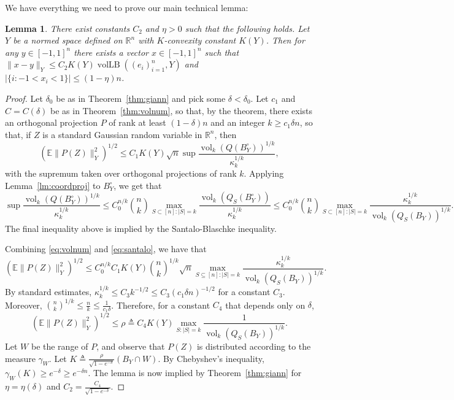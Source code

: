 \documentclass{article}
\newtheorem{lemma}{Lemma}
\newcommand{\R}{{\mathbb{R}}}
\newcommand{\E}{\mathbb{E}}
\newcommand{\eqdef}{\triangleq}
\DeclareMathOperator{\vollb}{volLB}
\DeclareMathOperator{\vol}{vol}
\begin{document}
We have everything we need to prove our main technical lemma:
\begin{lemma}\label{lm:partial}
  There exist constants $C_2$ and $\eta >0$ such that the following
  holds. Let $Y$ be a normed space defined on $\R^n$ with
  $K$-convexity constant $K(Y)$.  Then for any $y \in [-1, 1]^n$ there
  exists a vector $x \in [-1,1]^n$ such that $\|x-y\|_Y \le
  C_2K(Y)\vollb((e_i)_{i=1}^n, Y)$ and $|\{i: -1 < x_i < 1\}| \le
  (1-\eta)n$.
\end{lemma}
\begin{proof}
  Let $\delta_0$ be as in Theorem~\ref{thm:giann} and pick some
  $\delta < \delta_0$. Let $c_1$ and $C = C(\delta)$ be as in
  Theorem~\ref{thm:volnum}, so that, by the theorem, there exists an
  orthogonal projection $P$ of rank at least $(1-\delta)n$ and an
  integer $k \ge c_1 \delta n$, so that, if $Z$ is a standard Gaussian
  random variable in $\R^n$, then
  \begin{equation}\label{eq:volnum}
    \left(\E \|P(Z)\|_Y^2\right)^{1/2} \le
    C_1K(Y)\sqrt{n}
    \sup \frac{\vol_{k}(Q(B_Y^\circ))^{1/k}}{\kappa_k^{1/k}},
  \end{equation}
  with the supremum taken over orthogonal projections of rank
  $k$. Applying Lemma~\ref{lm:coordproj} to $B_Y^\circ$, we get that
  \begin{equation}\label{eq:santalo}
    \sup \frac{\vol_{k}(Q(B_Y^\circ))^{1/k}}{\kappa_k^{1/k}}
    \le 
    C_0^{n/k}{n \choose k}   \max_{S \subset [n]: |S|  = k} \frac{\vol_k(Q_S(B_Y^\circ))}{\kappa_k^{1/k}}
    \le 
    C_0^{n/k}{n \choose k}  \max_{S \subset [n]: |S|  = k} \frac{\kappa_k^{1/k}}{\vol_k(Q_{S}(B_Y))^{1/k}}.
  \end{equation}
  The final inequality above is implied by the Santalo-Blaschke inequality.
  

  Combining \eqref{eq:volnum} and \eqref{eq:santalo}, we have that
  \[
  \left(\E \|P(Z)\|_Y^2\right)^{1/2} \le
  C_0^{n/k} C_1 K(Y)   {n\choose  k}^{1/k}  \sqrt{n}
  \max_{S \subseteq [n]: |S| = k}
  \frac{\kappa_k^{1/k}}{\vol_k(Q_{S}(B_Y))^{1/k}}.
  \]
  By standard estimates, $\kappa_k^{1/k} \le C_3 k^{-1/2} \le C_3
  (c_1\delta n)^{-1/2}$ for a constant $C_3$. Moreover, ${n \choose
    k}^{1/k} \le \frac{n}{k} \le \frac{1}{c_1\delta}$. Therefore, for a
  constant $C_4$ that depends only on $\delta$,
  \[
  \left(\E \|P(Z)\|_Y^2\right)^{1/2} \le \rho \eqdef
  C_4K(Y) \max_{S: |S| = k}\frac{1}{\vol_k(Q_{S}(B_Y))^{1/k}}.
  \]
  Let $W$ be the range of $P$, and observe that $P(Z)$ is distributed
  according to the measure $\gamma_W$. Let $K \eqdef
  \frac{\rho}{\sqrt{1 - e^{-\delta}}} (B_Y \cap W)$. By Chebyshev's inequality,
  $\gamma_W(K) \ge e^{-\delta} \ge e^{-\delta n}$. The lemma is now
  implied by Theorem~\ref{thm:giann} for $\eta = \eta(\delta)$ and
  $C_2 =   \frac{C_4}{\sqrt{1 - e^{-\delta}}}$. 
\end{proof}
\end{document}

